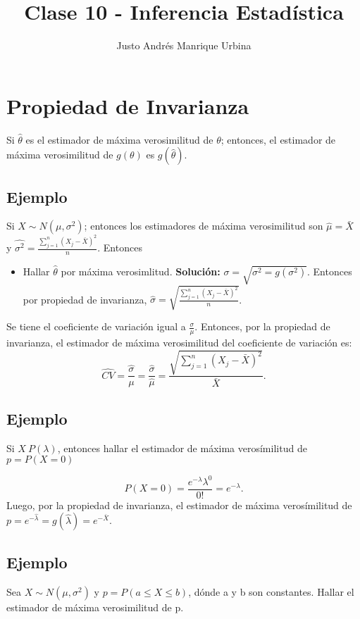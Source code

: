 \documentclass{article}
\title{Clase 10 - Inferencia Estadística}
\author{Justo Andrés Manrique Urbina}
\begin{document}
\maketitle

\section{Propiedad de Invarianza}

Si $\hat{\theta}$ es el estimador de máxima verosimilitud de $\theta$; entonces, el estimador de máxima verosimilitud de $g{(\theta)}$ es $g{(\hat{\theta})}$.

\subsection{Ejemplo}

Si $X \sim N{(\mu,\sigma^{2})}$; entonces los estimadores de máxima verosimilitud son $\hat{\mu}=\bar{X}$ y $\hat{\sigma^{2}}=\frac{\sum_{j=1}^{n}{(X_{j}-\bar{X})}^{2}}{n}$. Entonces
\begin{itemize}
	\item Hallar $\hat{\theta}$ por máxima verosimlitud. \textbf{Solución: }$\sigma=\sqrt{\sigma^{2}=g{(\sigma^{2})}}$. Entonces por propiedad de invarianza, $\hat{\sigma}=\sqrt{\frac{\sum_{j=1}^{n}{(X_{j}-\bar{X})}^{2}}{n}}$.
\end{itemize}
 Se tiene el coeficiente de variación igual a $\frac{\sigma}{\mu}$. Entonces, por la propiedad de invarianza, el estimador de máxima verosimilitud del coeficiente de variación es:
\[ \hat{CV}=\hat{\frac{\sigma}{\mu}}=\frac{\hat{\sigma}}{\hat{\mu}}=\frac{\sqrt{\sum_{j=1}^{n}{(X_{j}-\bar{X})^{2}}}}{\bar{X}}.\]

\subsection{Ejemplo}

Si $X~P{(\lambda)}$, entonces hallar el estimador de máxima verosímilitud de $p=P{(X=0)}$

\[ P{(X=0)}=\frac{e^{-\lambda}\lambda^{0}}{0!}= e^{-\lambda}.\]
Luego, por la propiedad de invarianza, el estimador de máxima verosímilitud de $p=e^{-\hat{\lambda}}=g{(\hat{\lambda})}=e^{-\bar{X}}$.

\subsection{Ejemplo}
Sea $X\sim N{(\mu,\sigma^{2})}$ y $p=P{(a\leq X\leq b)}$, dónde a y b son constantes. Hallar el estimador de máxima verosimilitud de p.
\end{document}
